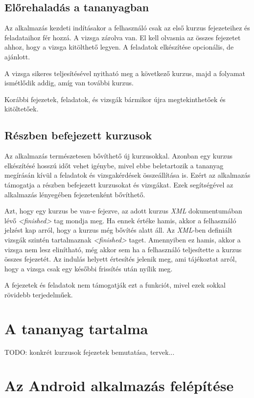 \documentclass[12pt,a4paper]{article}
\newcommand{\xml}{\textit{XML}\xspace}
\begin{document}
	\subsection{Előrehaladás a tananyagban}
	
	Az alkalmazás kezdeti indításakor a felhasználó csak az első kurzus fejezeteihez és feladataihoz fér hozzá. A vizsga zárolva van. El kell olvasnia az összes fejezetet ahhoz, hogy a vizsga kitölthető legyen. A feladatok elkészítése opcionális, de ajánlott.
	
	A vizsga sikeres teljesítésével nyitható meg a következő kurzus, majd a folyamat ismétlődik addig, amíg van további kurzus.
	
	Korábbi fejezetek, feladatok, és vizsgák bármikor újra megtekinthetőek és kitöltetőek. 
	
	\subsection{Részben befejezett kurzusok}\label{reszben_befejezett_kurzusok}
	
	Az alkalmazás természetesen bővíthető új kurzusokkal. Azonban egy kurzus elkészítésé hosszú időt vehet igénybe, mivel ebbe beletartozik a tananyag megírásán kívül a feladatok és vizsgakérdések összeállítása is. Ezért az alkalmazás támogatja a részben befejezett kurzusokat és vizsgákat. Ezek segítségével az alkalmazás lényegében fejezetenként bővíthető.
	
	Azt, hogy egy kurzus be van-e fejezve, az adott kurzus \xml dokumentumában lévő \textit{<finished>} tag mondja meg. Ha ennek értéke hamis, akkor a felhasználó jelzést kap arról, hogy a kurzus még bővítés alatt áll. Az \xml-ben definiált vizsgák szintén tartalmaznak  \textit{<finished>} taget. Amennyiben ez hamis, akkor a vizsga nem lesz elinítható, még akkor sem ha a felhasználó teljesítette a kurzus összes fejezetét. Az indulás helyett értesítés jelenik meg, ami tájékoztat arról, hogy a vizsga csak egy későbbi frissítés után nyílik meg.
	
	A fejezetek és feladatok nem támogatják ezt a funkciót, mivel ezek sokkal rövidebb terjedelműek.
	
	\section{A tananyag tartalma}
	
	TODO: konkrét kurzusok fejezetek bemutatása, tervek...
	
	\section{Az Android alkalmazás felépítése}\label{android_alk_felepites}
	
\end{document}
